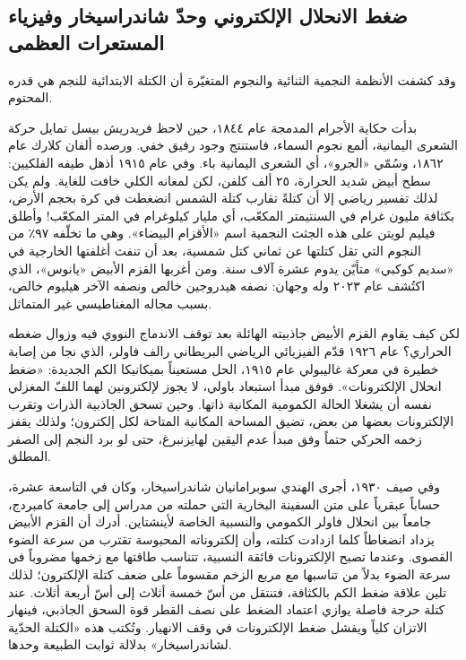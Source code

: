 \documentclass[12pt,a4paper,openany]{book}
\begin{document}
\subsection*{ضغط الانحلال الإلكتروني وحدّ شاندراسيخار وفيزياء المستعرات العظمى}

وقد كشفت الأنظمة النجمية الثنائية والنجوم المتغيّرة أن الكتلة الابتدائية للنجم هي قدره المحتوم.


بدأت حكاية الأجرام المدمجة عام ١٨٤٤، حين لاحظ فريدريش بيسل تمايل حركة الشعرى اليمانية، ألمع نجوم السماء، فاستنتج وجود رفيق خفي. ورصده ألفان كلارك عام ١٨٦٢، وسُمّي «الجرو»، أي الشعرى اليمانية باء. وفي عام ١٩١٥ أذهل طيفه الفلكيين: سطح أبيض شديد الحرارة، ٢٥ ألف كلفن، لكن لمعانه الكلي خافت للغاية. ولم يكن لذلك تفسير رياضي إلا أن كتلةً تقارب كتلة الشمس انضغطت في كرة بحجم الأرض، بكثافة مليون غرام في السنتيمتر المكعّب، أي مليار كيلوغرام في المتر المكعّب! وأطلق فيليم لويتن على هذه الجثث النجمية اسم «الأقزام البيضاء». وهي ما تخلّفه ٩٧٪ من النجوم التي تقل كتلتها عن ثماني كتل شمسية، بعد أن تنفث أغلفتها الخارجية في «سديم كوكبي» متأيّن يدوم عشرة آلاف سنة. ومن أغربها القزم الأبيض «يانوس»، الذي اكتُشف عام ٢٠٢٣ وله وجهان: نصفه هيدروجين خالص ونصفه الآخر هيليوم خالص، بسبب مجاله المغناطيسي غير المتماثل.


لكن كيف يقاوم القزم الأبيض جاذبيته الهائلة بعد توقف الاندماج النووي فيه وزوال ضغطه الحراري؟ عام ١٩٢٦ قدّم الفيزيائي الرياضي البريطاني رالف فاولر، الذي نجا من إصابة خطيرة في معركة غاليبولي عام ١٩١٥، الحل مستعيناً بميكانيكا الكم الجديدة: «ضغط انحلال الإلكترونات». فوفق مبدأ استبعاد باولي، لا يجوز لإلكترونين لهما اللفّ المغزلي نفسه أن يشغلا الحالة الكمومية المكانية ذاتها. وحين تسحق الجاذبية الذرات وتقرب الإلكترونات بعضها من بعض، تضيق المساحة المكانية المتاحة لكل إلكترون؛ ولذلك يقفز زخمه الحركي حتماً وفق مبدأ عدم اليقين لهايزنبرغ، حتى لو برد النجم إلى الصفر المطلق.


وفي صيف ١٩٣٠، أجرى الهندي سوبرامانيان شاندراسيخار، وكان في التاسعة عشرة، حساباً عبقرياً على متن السفينة البخارية التي حملته من مدراس إلى جامعة كامبردج، جامعاً بين انحلال فاولر الكمومي والنسبية الخاصة لأينشتاين. أدرك أن القزم الأبيض يزداد انضغاطاً كلما ازدادت كتلته، وأن إلكتروناته المحبوسة تقترب من سرعة الضوء القصوى. وعندما تصبح الإلكترونات فائقة النسبية، تتناسب طاقتها مع زخمها مضروباً في سرعة الضوء بدلاً من تناسبها مع مربع الزخم مقسوماً على ضعف كتلة الإلكترون؛ لذلك تلين علاقة ضغط الكم بالكثافة، فتنتقل من أسّ خمسة أثلاث إلى أسّ أربعة أثلاث. عند كتلة حرجة فاصلة يوازي اعتماد الضغط على نصف القطر قوة السحق الجاذبي، فينهار الاتزان كلياً ويفشل ضغط الإلكترونات في وقف الانهيار. وتُكتب هذه «الكتلة الحدّية لشاندراسيخار» بدلالة ثوابت الطبيعة وحدها.
\end{document}
